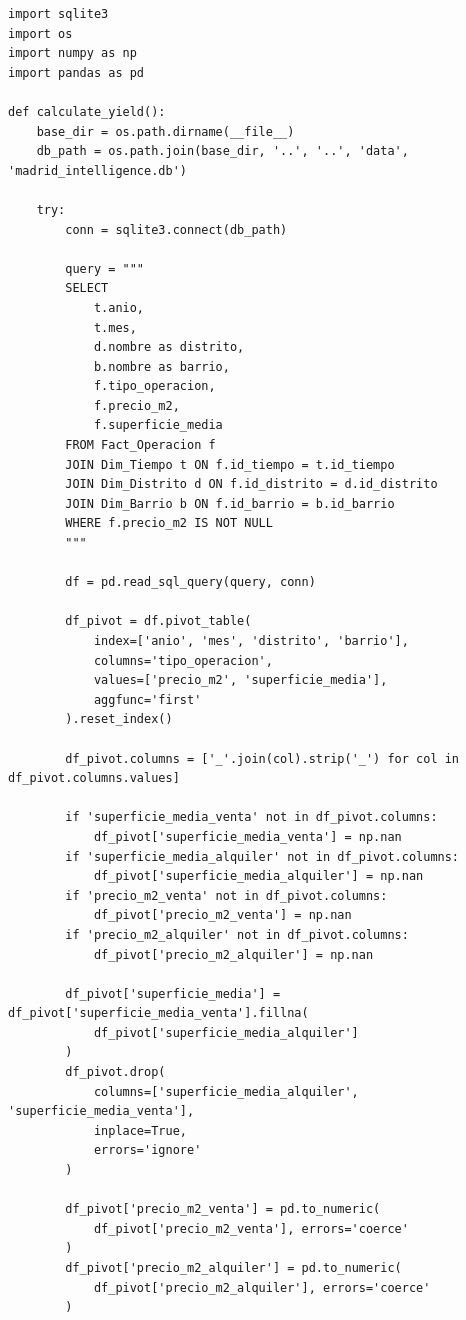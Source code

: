 \documentclass[a4paper,11pt,openany]{book}
\begin{document}
\begin{lstlisting}
import sqlite3
import os
import numpy as np
import pandas as pd

def calculate_yield():
    base_dir = os.path.dirname(__file__)
    db_path = os.path.join(base_dir, '..', '..', 'data', 'madrid_intelligence.db')

    try:
        conn = sqlite3.connect(db_path)
        
        query = """
        SELECT 
            t.anio, 
            t.mes, 
            d.nombre as distrito, 
            b.nombre as barrio,
            f.tipo_operacion,
            f.precio_m2,
            f.superficie_media
        FROM Fact_Operacion f
        JOIN Dim_Tiempo t ON f.id_tiempo = t.id_tiempo
        JOIN Dim_Distrito d ON f.id_distrito = d.id_distrito
        JOIN Dim_Barrio b ON f.id_barrio = b.id_barrio
        WHERE f.precio_m2 IS NOT NULL
        """
        
        df = pd.read_sql_query(query, conn)
        
        df_pivot = df.pivot_table(
            index=['anio', 'mes', 'distrito', 'barrio'], 
            columns='tipo_operacion', 
            values=['precio_m2', 'superficie_media'],
            aggfunc='first'
        ).reset_index()

        df_pivot.columns = ['_'.join(col).strip('_') for col in df_pivot.columns.values]
        
        if 'superficie_media_venta' not in df_pivot.columns:
            df_pivot['superficie_media_venta'] = np.nan
        if 'superficie_media_alquiler' not in df_pivot.columns:
            df_pivot['superficie_media_alquiler'] = np.nan
        if 'precio_m2_venta' not in df_pivot.columns:
            df_pivot['precio_m2_venta'] = np.nan
        if 'precio_m2_alquiler' not in df_pivot.columns:
            df_pivot['precio_m2_alquiler'] = np.nan

        df_pivot['superficie_media'] = df_pivot['superficie_media_venta'].fillna(
            df_pivot['superficie_media_alquiler']
        )
        df_pivot.drop(
            columns=['superficie_media_alquiler', 'superficie_media_venta'], 
            inplace=True, 
            errors='ignore'
        )
        
        df_pivot['precio_m2_venta'] = pd.to_numeric(
            df_pivot['precio_m2_venta'], errors='coerce'
        )
        df_pivot['precio_m2_alquiler'] = pd.to_numeric(
            df_pivot['precio_m2_alquiler'], errors='coerce'
        )


\end{lstlisting}
\end{document}
